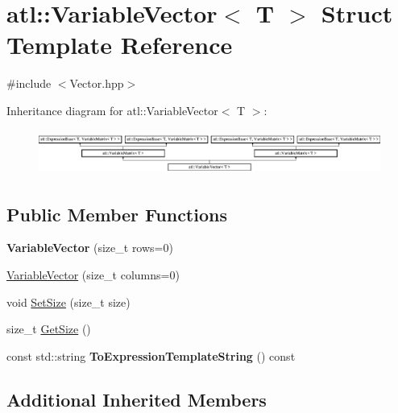 \hypertarget{structatl_1_1_variable_vector}{\section{atl\+:\+:Variable\+Vector$<$ T $>$ Struct Template Reference}
\label{structatl_1_1_variable_vector}
}


{\ttfamily \#include $<$Vector.\+hpp$>$}

Inheritance diagram for atl\+:\+:Variable\+Vector$<$ T $>$\+:\begin{figure}[H]
\begin{center}
\leavevmode
\includegraphics[height=1.484099cm]{structatl_1_1_variable_vector}
\end{center}
\end{figure}
\subsection*{Public Member Functions}
\begin{DoxyCompactItemize}
\item 
\hypertarget{structatl_1_1_variable_vector_ae69a156b19198f88af6383b33248e670}{{\bfseries Variable\+Vector} (size\+\_\+t rows=0)}\label{structatl_1_1_variable_vector_ae69a156b19198f88af6383b33248e670}

\item 
\hyperlink{structatl_1_1_variable_vector_a1328520eff96ab71f264146784d898ff}{Variable\+Vector} (size\+\_\+t columns=0)
\item 
void \hyperlink{structatl_1_1_variable_vector_a70470ad963a0126c2c7075c42348452d}{Set\+Size} (size\+\_\+t size)
\item 
size\+\_\+t \hyperlink{structatl_1_1_variable_vector_a5bd3fe223daeb5bf9d2358d93538a28c}{Get\+Size} ()
\item 
\hypertarget{structatl_1_1_variable_vector_aada89a21ba6184e7a1e3c6380cf9378c}{const std\+::string {\bfseries To\+Expression\+Template\+String} () const }\label{structatl_1_1_variable_vector_aada89a21ba6184e7a1e3c6380cf9378c}

\end{DoxyCompactItemize}
\subsection*{Additional Inherited Members}


